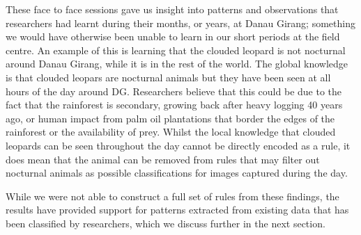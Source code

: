 			These face to face sessions gave us insight into patterns and observations that researchers had learnt during their months, or years, at Danau Girang; something we would have otherwise been unable to learn in our short periods at the field centre. An example of this is learning that the clouded leopard is not nocturnal around Danau Girang, while it is in the rest of the world. The global knowledge is that clouded leopars are nocturnal animals but they have been seen at all hours of the day around DG. Researchers believe that this could be due to the fact that the rainforest is secondary, growing back after heavy logging 40 years ago, or human impact from palm oil plantations that border the edges of the rainforest or the availability of prey. Whilst the local knowledge that clouded leopards can be seen throughout the day cannot be directly encoded as a rule, it does mean that the animal can be removed from rules that may filter out nocturnal animals as possible classifications for images captured during the day.

			While we were not able to construct a full set of rules from these findings, the results have provided support for patterns extracted from existing data that has been classified by researchers, which we discuss further in the next section. 
			
